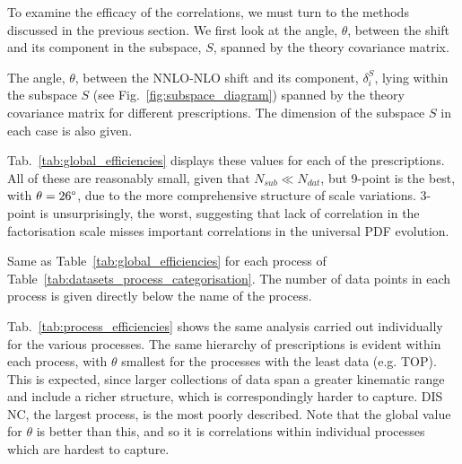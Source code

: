 To examine the efficacy of the correlations, we must turn to the methods discussed in the previous section. We first look at the angle, $\theta$, between the shift and its component in the subspace, $S$, spanned by the theory covariance matrix. 
\begin{table}[H]
	\centering
	
        \vspace{5mm}
	\caption{\small The angle, $\theta$, between the NNLO-NLO
          shift and its component, $\delta_i^S$, lying within the
          subspace $S$ (see Fig.~\ref{fig:subspace_diagram})
          spanned by the theory covariance matrix for  different
          prescriptions. The dimension of the subspace $S$ in each case
          is also given.}
	\label{tab:global_efficiencies}
\end{table}
Tab.~\ref{tab:global_efficiencies} displays these values for each of the prescriptions. All of these are reasonably small, given that $N_{sub} \ll N_{dat}$, but 9-point is the best, with $\theta = 26 \degree$, due to the more comprehensive structure of scale variations. 3-point is unsurprisingly, the worst, suggesting that lack of correlation in the factorisation scale misses important correlations in the universal PDF evolution.
\begin{table}[H]
	\centering
	\small
	
        \vspace{3mm}
	\caption{Same as Table~\ref{tab:global_efficiencies}
          for each process of Table~\ref{tab:datasets_process_categorisation}. The number of data points in each process is given directly below the name of the process.}
	\label{tab:process_efficiencies}
\end{table}
Tab.~\ref{tab:process_efficiencies} shows the same analysis carried out individually for the various processes. The same hierarchy of prescriptions is evident within each process, with $\theta$ smallest for the processes with the least data (e.g. TOP). This is expected, since larger collections of data span a greater kinematic range and include a richer structure, which is correspondingly harder to capture. DIS NC, the largest process, is the most poorly described. Note that the global value for $\theta$ is better than this, and so it is correlations within individual processes which are hardest to capture.


